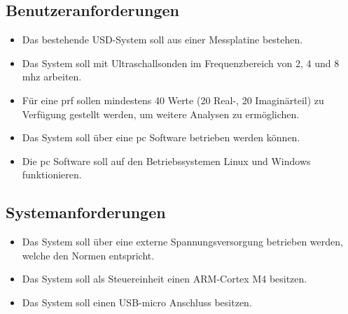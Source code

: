 \subsection*{Benutzeranforderungen}
\begin{itemize}\itemsep0pt
\item Das bestehende USD-System soll aus einer Messplatine bestehen.
\item Das System soll mit Ultraschallsonden im Frequenzbereich von 2, 4 und 8 \ac{mhz} arbeiten.
\item Für eine \ac{prf} sollen mindestens 40 Werte (20 Real-, 20 Imaginärteil) zu Verfügung gestellt werden, um weitere Analysen zu ermöglichen.
\item Das System soll über eine \ac{pc} Software betrieben werden können.
\item Die \ac{pc} Software soll auf den Betriebssystemen Linux und Windows funktionieren.
\end{itemize}
\subsection*{Systemanforderungen}\label{sec:sysreq}
\begin{itemize}\itemsep0pt
\item Das System soll über eine externe Spannungsversorgung betrieben werden, welche den Normen entspricht.
\item Das System soll als Steuereinheit einen ARM-Cortex M4 besitzen.
\item Das System soll einen USB-micro Anschluss besitzen.
\end{itemize}
